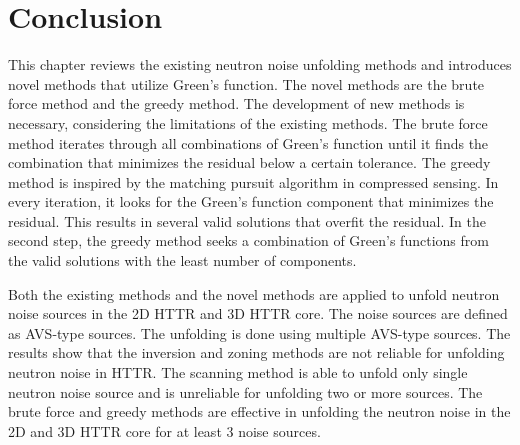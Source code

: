 \section{Conclusion}

This chapter reviews the existing neutron noise unfolding methods and introduces novel methods that utilize Green’s function. The novel methods are the brute force method and the greedy method. The development of new methods is necessary, considering the limitations of the existing methods. The brute force method iterates through all combinations of Green’s function until it finds the combination that minimizes the residual below a certain tolerance. The greedy method is inspired by the matching pursuit algorithm in compressed sensing. In every iteration, it looks for the Green’s function component that minimizes the residual. This results in several valid solutions that overfit the residual. In the second step, the greedy method seeks a combination of Green’s functions from the valid solutions with the least number of components. 

Both the existing methods and the novel methods are applied to unfold neutron noise sources in the 2D HTTR and 3D HTTR core. The noise sources are defined as AVS-type sources. The unfolding is done using multiple AVS-type sources. The results show that the inversion and zoning methods are not reliable for unfolding neutron noise in HTTR. The scanning method is able to unfold only single neutron noise source and is unreliable for unfolding two or more sources. The brute force and greedy methods are effective in unfolding the neutron noise in the 2D and 3D HTTR core for at least 3 noise sources.